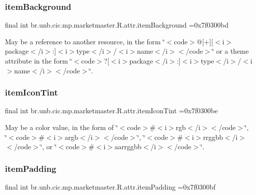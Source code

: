 \subsubsection{\texorpdfstring{item\+Background}{itemBackground}}
{\footnotesize\ttfamily final int br.\+unb.\+cic.\+mp.\+marketmaster.\+R.\+attr.\+item\+Background =0x7f0300bd\hspace{0.3cm}{\ttfamily [static]}}

May be a reference to another resource, in the form \char`\"{}$<$code$>$@\mbox{[}+\mbox{]}\mbox{[}$<$i$>$package$<$/i$>$\+:\mbox{]}$<$i$>$type$<$/i$>$/$<$i$>$name$<$/i$>$$<$/code$>$\char`\"{} or a theme attribute in the form \char`\"{}$<$code$>$?\mbox{[}$<$i$>$package$<$/i$>$\+:\mbox{]}$<$i$>$type$<$/i$>$/$<$i$>$name$<$/i$>$$<$/code$>$\char`\"{}. \mbox{\label{classbr_1_1unb_1_1cic_1_1mp_1_1marketmaster_1_1R_1_1attr_ac7718248abe0a7a6cd26d5300839d21f}} 
\subsubsection{\texorpdfstring{item\+Icon\+Tint}{itemIconTint}}
{\footnotesize\ttfamily final int br.\+unb.\+cic.\+mp.\+marketmaster.\+R.\+attr.\+item\+Icon\+Tint =0x7f0300be\hspace{0.3cm}{\ttfamily [static]}}

May be a color value, in the form of \char`\"{}$<$code$>$\#$<$i$>$rgb$<$/i$>$$<$/code$>$\char`\"{}, \char`\"{}$<$code$>$\#$<$i$>$argb$<$/i$>$$<$/code$>$\char`\"{}, \char`\"{}$<$code$>$\#$<$i$>$rrggbb$<$/i$>$$<$/code$>$\char`\"{}, or \char`\"{}$<$code$>$\#$<$i$>$aarrggbb$<$/i$>$$<$/code$>$\char`\"{}. \mbox{\label{classbr_1_1unb_1_1cic_1_1mp_1_1marketmaster_1_1R_1_1attr_aeadb3be4ef7ab8cad08bb8012f191c24}} 
\subsubsection{\texorpdfstring{item\+Padding}{itemPadding}}
{\footnotesize\ttfamily final int br.\+unb.\+cic.\+mp.\+marketmaster.\+R.\+attr.\+item\+Padding =0x7f0300bf\hspace{0.3cm}{\ttfamily [static]}}

